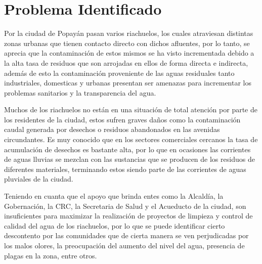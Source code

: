 \section{Problema Identificado}
  Por la ciudad de Popayán pasan varios riachuelos, los cuales atraviesan distintas zonas urbanas que tienen contacto directo con dichos afluentes, por lo tanto, se aprecia que la contaminación de estos mismos se ha visto incrementada debido a la alta tasa de residuos que son arrojadas en ellos de forma directa e indirecta, además de esto la contaminación proveniente de las aguas residuales tanto industriales, domesticas y urbanas presentan ser amenazas para incrementar los problemas sanitarios y la transparencia del agua.

  Muchos de los riachuelos no están en una situación de total atención por parte de los residentes de la ciudad, estos sufren graves daños como la contaminación caudal generada por desechos o residuos abandonados en las avenidas circundantes. Es muy conocido que en los sectores comerciales cercanos la tasa de acumulación de desechos es bastante alta, por lo que en ocasiones las corrientes de aguas lluvias se mezclan con las sustancias que se producen de los residuos de diferentes materiales, terminando estos siendo parte de las corrientes de aguas pluviales de la ciudad.
  
  Teniendo en cuanta que el apoyo que brinda entes como la Alcaldía, la Gobernación, la CRC, la Secretaria de Salud y el Acueducto de la ciudad, son insuficientes para maximizar la realización de proyectos de limpieza y control de calidad del agua de los riachuelos, por lo que se puede identificar cierto descontento por las comunidades que de cierta manera se ven perjudicadas por los malos olores, la preocupación del aumento del nivel del agua, presencia de plagas en la zona, entre otros. 

